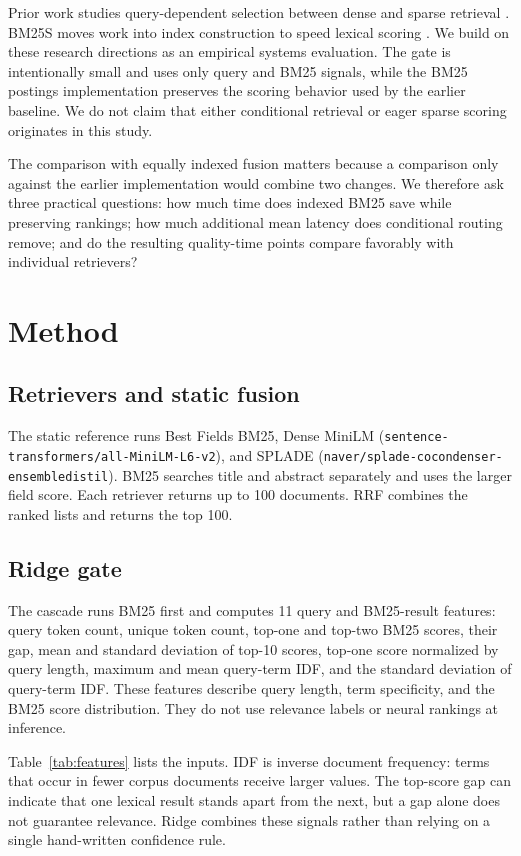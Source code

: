 \documentclass[conference]{IEEEtran}
\begin{document}
Prior work studies query-dependent selection between dense and sparse retrieval \cite{adaptive}. BM25S moves work into index construction to speed lexical scoring \cite{bm25s}. We build on these research directions as an empirical systems evaluation. The gate is intentionally small and uses only query and BM25 signals, while the BM25 postings implementation preserves the scoring behavior used by the earlier baseline. We do not claim that either conditional retrieval or eager sparse scoring originates in this study.

The comparison with equally indexed fusion matters because a comparison only against the earlier implementation would combine two changes. We therefore ask three practical questions: how much time does indexed BM25 save while preserving rankings; how much additional mean latency does conditional routing remove; and do the resulting quality-time points compare favorably with individual retrievers?

\section{Method}
\subsection{Retrievers and static fusion}
The static reference runs Best Fields BM25, Dense MiniLM (\texttt{sentence-transformers/all-MiniLM-L6-v2}), and SPLADE (\texttt{naver/splade-cocondenser-ensembledistil}). BM25 searches title and abstract separately and uses the larger field score. Each retriever returns up to 100 documents. RRF combines the ranked lists and returns the top 100.

\subsection{Ridge gate}
The cascade runs BM25 first and computes 11 query and BM25-result features: query token count, unique token count, top-one and top-two BM25 scores, their gap, mean and standard deviation of top-10 scores, top-one score normalized by query length, maximum and mean query-term IDF, and the standard deviation of query-term IDF. These features describe query length, term specificity, and the BM25 score distribution. They do not use relevance labels or neural rankings at inference.

Table~\ref{tab:features} lists the inputs. IDF is inverse document frequency: terms that occur in fewer corpus documents receive larger values. The top-score gap can indicate that one lexical result stands apart from the next, but a gap alone does not guarantee relevance. Ridge combines these signals rather than relying on a single hand-written confidence rule.
\end{document}
